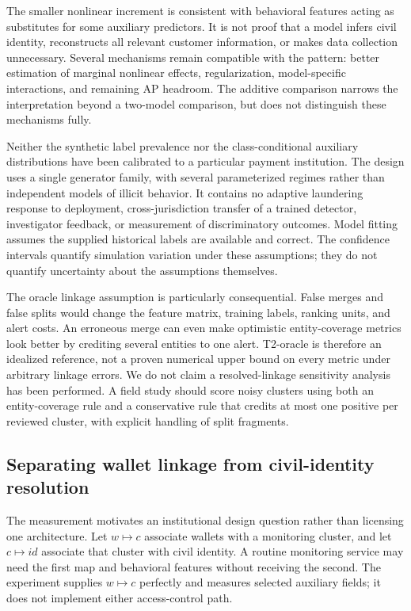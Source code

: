 \documentclass[11pt,a4paper]{article}
\begin{document}
The smaller nonlinear increment is consistent with behavioral features acting as substitutes for some auxiliary predictors. It is not proof that a model infers civil identity, reconstructs all relevant customer information, or makes data collection unnecessary. Several mechanisms remain compatible with the pattern: better estimation of marginal nonlinear effects, regularization, model-specific interactions, and remaining AP headroom. The additive comparison narrows the interpretation beyond a two-model comparison, but does not distinguish these mechanisms fully.

Neither the synthetic label prevalence nor the class-conditional auxiliary distributions have been calibrated to a particular payment institution. The design uses a single generator family, with several parameterized regimes rather than independent models of illicit behavior. It contains no adaptive laundering response to deployment, cross-jurisdiction transfer of a trained detector, investigator feedback, or measurement of discriminatory outcomes. Model fitting assumes the supplied historical labels are available and correct. The confidence intervals quantify simulation variation under these assumptions; they do not quantify uncertainty about the assumptions themselves.

The oracle linkage assumption is particularly consequential. False merges and false splits would change the feature matrix, training labels, ranking units, and alert costs. An erroneous merge can even make optimistic entity-coverage metrics look better by crediting several entities to one alert. T2-oracle is therefore an idealized reference, not a proven numerical upper bound on every metric under arbitrary linkage errors. We do not claim a resolved-linkage sensitivity analysis has been performed. A field study should score noisy clusters using both an entity-coverage rule and a conservative rule that credits at most one positive per reviewed cluster, with explicit handling of split fragments.

\subsection{Separating wallet linkage from civil-identity resolution}
The measurement motivates an institutional design question rather than licensing one architecture. Let $w\mapsto c$ associate wallets with a monitoring cluster, and let $c\mapsto id$ associate that cluster with civil identity. A routine monitoring service may need the first map and behavioral features without receiving the second. The experiment supplies $w\mapsto c$ perfectly and measures selected auxiliary fields; it does not implement either access-control path.
\end{document}
